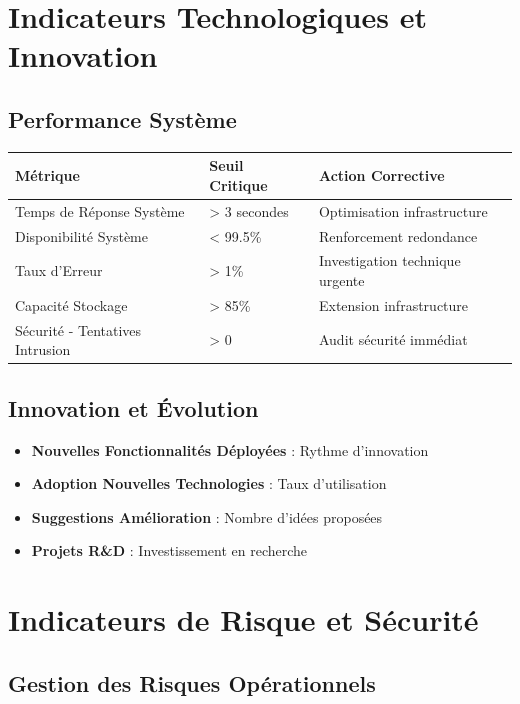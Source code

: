\documentclass[12pt,a4paper]{article}
\begin{document}
\section{Indicateurs Technologiques et Innovation}

\subsection{Performance Système}

\begin{longtable}{|p{4cm}|p{3cm}|p{6cm}|}
\hline
\rowcolor{lightgray}
\textbf{Métrique} & \textbf{Seuil Critique} & \textbf{Action Corrective} \\
\hline
\endhead

Temps de Réponse Système & > 3 secondes & Optimisation infrastructure \\
\hline
Disponibilité Système & < 99.5\% & Renforcement redondance \\
\hline
Taux d'Erreur & > 1\% & Investigation technique urgente \\
\hline
Capacité Stockage & > 85\% & Extension infrastructure \\
\hline
Sécurité - Tentatives Intrusion & > 0 & Audit sécurité immédiat \\
\hline
\end{longtable}

\subsection{Innovation et Évolution}

\begin{itemize}
    \item \textbf{Nouvelles Fonctionnalités Déployées} : Rythme d'innovation
    \item \textbf{Adoption Nouvelles Technologies} : Taux d'utilisation
    \item \textbf{Suggestions Amélioration} : Nombre d'idées proposées
    \item \textbf{Projets R\&D} : Investissement en recherche
\end{itemize}

\section{Indicateurs de Risque et Sécurité}

\subsection{Gestion des Risques Opérationnels}
\end{document}
